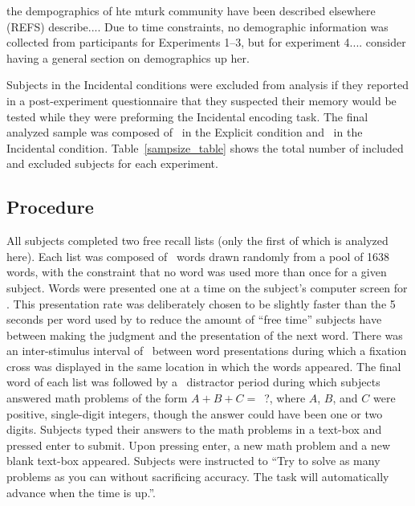 \documentclass[jou,natbib,floatsintext]{apa6} %
\begin{document}
\label{TODO-10} the dempographics of hte mturk community have been described elsewhere (REFS) describe.... Due to time constraints, no demographic information was collected from participants for Experiments 1--3, but for experiment 4.... consider having a general section on demographics up her. 

Subjects in the Incidental conditions were excluded from analysis if they reported in a post-experiment questionnaire that they suspected their memory would be tested while they were preforming the Incidental encoding task. The final analyzed sample was composed of \shoeExplicitIncluded~in the Explicit condition and \shoeIncidentalIncluded~in the Incidental condition. Table~\ref{sampsize_table} shows the total number of included and excluded subjects for each experiment.

\subsection{Procedure}
All subjects completed two free recall lists (only the first of which is analyzed here). Each list was composed of \listlength~words drawn randomly from a pool of 1638 words, with the constraint that no word was used more than once for a given subject. Words were presented one at a time on the subject's computer screen for \presrate. This presentation rate was deliberately chosen to be slightly faster than the 5 seconds per word used by \citet{NairEtal17} to reduce the amount of ``free time'' subjects have between making the judgment and the presentation of the next word.
There was an inter-stimulus interval of \isi~between word presentations during which a fixation cross was displayed in the same location in which the words appeared. The final word of each list was followed by a \DFRDelay~distractor period during which subjects answered math problems of the form $A+B+C=$~?, where $A$, $B$, and $C$ were positive, single-digit integers, though the answer could have been one or two digits. Subjects typed their answers to the math problems in a text-box and pressed enter to submit. Upon pressing enter, a new math problem and a new blank text-box appeared. Subjects were instructed to ``Try to solve as many problems as you can without sacrificing accuracy. The task will automatically advance when the time is up.''.
\end{document}
